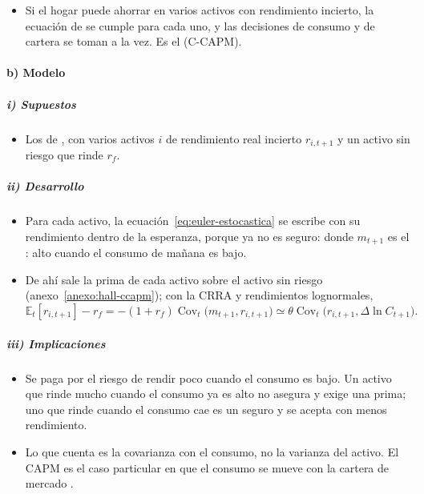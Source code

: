 \documentclass[11pt]{article}
\begin{document}
\begin{itemize}
\item Si el hogar puede ahorrar en varios activos con rendimiento incierto, la ecuación de  se cumple para cada uno, y las decisiones de consumo y de cartera se toman a la vez. Es el  (C-CAPM)\nocite{Lucas1978Asset,Breeden1979Intertemporal}.
\end{itemize}

\paragraph{b) Modelo}

\subparagraph{i) Supuestos}

\begin{itemize}
\item Los de , con varios activos $i$ de rendimiento real incierto $r_{i,t+1}$ y un activo sin riesgo que rinde $r_f$.
\end{itemize}

\subparagraph{ii) Desarrollo}

\begin{itemize}
\item Para cada activo, la ecuación~\eqref{eq:euler-estocastica} se escribe con su rendimiento dentro de la esperanza, porque ya no es seguro:
  donde $m_{t+1}$ es el : alto cuando el consumo de mañana es bajo.
\item De ahí sale la prima de cada activo sobre el activo sin riesgo (anexo~\ref{anexo:hall-ccapm}); con la CRRA y rendimientos lognormales,
  \begin{equation*}
  \mathbb{E}_t[r_{i,t+1}]-r_f=-(1+r_f)\operatorname{Cov}_t\big(m_{t+1},r_{i,t+1}\big)\simeq\theta\operatorname{Cov}_t\big(r_{i,t+1},\Delta\ln C_{t+1}\big).
  \end{equation*}
\end{itemize}

\subparagraph{iii) Implicaciones}

\begin{itemize}
\item Se paga por el riesgo de rendir poco cuando el consumo es bajo. Un activo que rinde mucho cuando el consumo ya es alto no asegura y exige una prima; uno que rinde cuando el consumo cae es un seguro y se acepta con menos rendimiento.
\item Lo que cuenta es la covarianza con el consumo, no la varianza del activo. El CAPM es el caso particular en que el consumo se mueve con la cartera de mercado .
\end{itemize}
\end{document}
